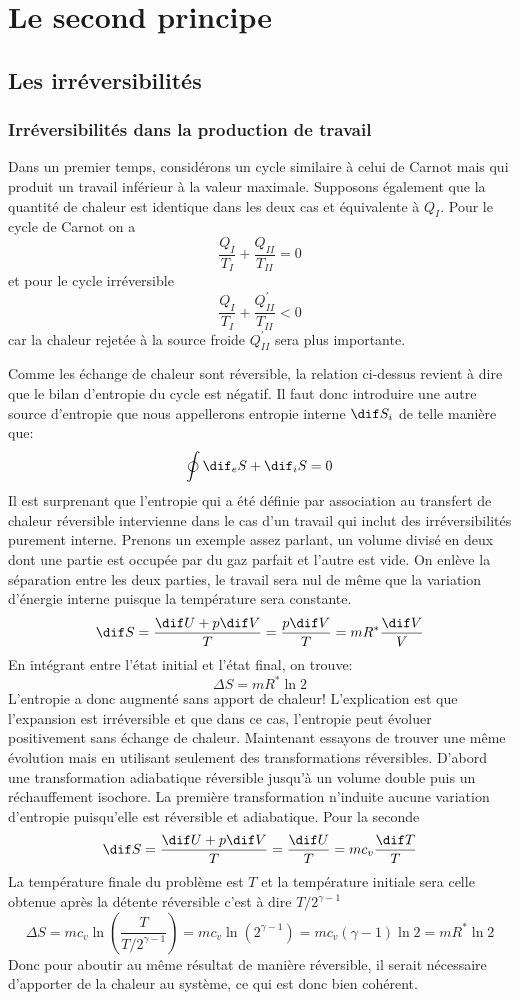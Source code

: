 \section{Le second principe}
\subsection{Les irréversibilités}
\subsubsection{Irréversibilités dans la production de travail}
Dans un premier temps, considérons un cycle similaire à
celui de Carnot mais qui produit un travail inférieur à la valeur maximale.
Supposons également que la quantité de chaleur est
identique dans les deux cas et équivalente à $Q_I$.
Pour le cycle de Carnot on a
\[ \frac {Q_I}{T_I} + \frac{Q_{II}}{T_{II}} = 0 \]
et pour le cycle irréversible
\[  \frac {Q_I}{T_I} + \frac {Q^{'}_{II}}{T_{II}} < 0 \]
car la chaleur rejetée à la source froide $Q^{'}_{II}$ sera plus importante.

Comme les échange de chaleur sont réversible, la relation
ci-dessus revient à dire que le bilan d'entropie du cycle est négatif.
Il faut donc introduire une autre source d'entropie que
nous appellerons entropie interne $\dif S_i$ de telle manière que:
\[ \oint \dif_eS +\dif_iS = 0 \]
Il est surprenant que l'entropie qui a été définie par association
au transfert de chaleur réversible intervienne dans le cas
d'un travail qui inclut des irréversibilités purement interne.
Prenons un exemple assez parlant,
un volume divisé en deux dont une partie est
occupée par du gaz parfait et l'autre est vide.
On enlève la séparation entre les deux parties,
le travail sera nul de même que la variation d'énergie interne
puisque la température sera constante.
\[ \dif S = \frac{\dif U+p\dif V}{T} = \frac{p\dif V}T = mR^*\frac{\dif V}V \]
En intégrant entre l'état initial et l'état final, on trouve:
\[ \Delta S = mR^* \ln 2 \]
L'entropie a donc augmenté sans apport de chaleur!
L'explication est que l'expansion est irréversible et que dans ce cas,
l'entropie peut évoluer positivement sans échange de chaleur.
Maintenant essayons de trouver une même évolution mais
en utilisant seulement des transformations réversibles.
D'abord une transformation adiabatique réversible jusqu'à
un volume double puis un réchauffement isochore.
La première transformation n'induite aucune
variation d'entropie puisqu'elle est réversible et adiabatique.
Pour la seconde
\[ \dif S = \frac{\dif U+ p\dif V}{T} = \frac{\dif U}{T} = mc_v\frac {\dif T}{T} \]
La température finale du problème est $T$ et la température initiale
sera celle obtenue après la détente réversible c'est à dire $T/2^{\gamma -1}$
\[ \Delta S = mc_v \ln \left(\frac T{T/2^{\gamma-1}}\right) =
mc_v \ln (2^{\gamma-1}) = mc_v(\gamma -1) \ln 2 = mR^*  \ln 2 \]
Donc pour aboutir au même résultat de manière réversible,
il serait nécessaire d'apporter de la chaleur au système,
ce qui est donc bien cohérent.

